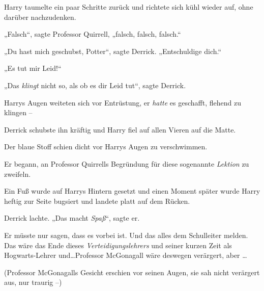 Harry taumelte ein paar Schritte zurück und richtete sich kühl wieder auf, ohne darüber nachzudenken.

„Falsch“, sagte Professor Quirrell, „falsch, falsch, falsch.“

„Du hast mich geschubst, Potter“, sagte Derrick. „Entschuldige dich.“

„Es tut mir Leid!“

„Das \emph{klingt} nicht so, als ob es dir Leid tut“, sagte Derrick.

Harrys Augen weiteten sich vor Entrüstung, er \emph{hatte} es geschafft, flehend zu klingen –

Derrick schubste ihn kräftig und Harry fiel auf allen Vieren auf die Matte.

Der blaue Stoff schien dicht vor Harrys Augen zu verschwimmen.

Er begann, an Professor Quirrells Begründung für diese sogenannte \emph{Lektion} zu zweifeln.

Ein Fuß wurde auf Harrys Hintern gesetzt und einen Moment später wurde Harry heftig zur Seite bugsiert und landete platt auf dem Rücken.

Derrick lachte. „Das macht \emph{Spaß}“, sagte er.

Er müsste nur sagen, dass es vorbei ist. Und das alles dem Schulleiter melden. Das wäre das Ende dieses \emph{Verteidigungslehrers} und seiner kurzen Zeit als Hogwarts-Lehrer und…Professor McGonagall wäre deswegen verärgert, aber …

(Professor McGonagalls Gesicht erschien vor seinen Augen, sie sah nicht verärgert aus, nur traurig –)

